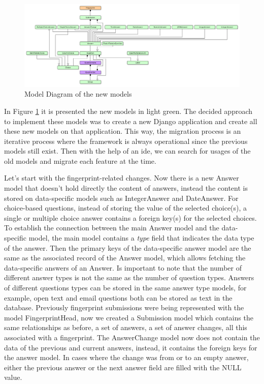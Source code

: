\begin{figure}[h]
    \center
    \includegraphics[width=\textwidth]{new-models}
    \caption{Model Diagram of the new models}
    \label{fig:new-models}
\end{figure}

In Figure \ref{fig:new-models} it is presented the new models in light green.
The decided approach to implement these models was to create a new Django application and create all these new models on that application.
This way, the migration process is an iterative process where the framework is always operational since the previous models still exist.
Then with the help of an \gls{ide}, we can search for usages of the old models and migrate each feature at the time.

Let's start with the fingerprint-related changes.
Now there is a new Answer model that doesn't hold directly the content of answers, instead the content is stored on data-specific models such as IntegerAnswer and DateAnswer.
For choice-based questions, instead of storing the value of the selected choice(s), a single or multiple choice answer contains a foreign key(s) for the selected choices.
To establish the connection between the main Answer model and the data-specific model, the main model contains a \textit{type} field that indicates the data type of the answer.
Then the primary keys of the data-specific answer model are the same as the associated record of the Answer model, which allows fetching the data-specific answers of an Answer.
Is important to note that the number of different answer types is not the same as the number of question types.
Answers of different questions types can be stored in the same answer type models, for example, open text and email questions both can be stored as text in the database.
Previously fingerprint submissions were being represented with the model FingerprintHead, now we created a Submission model which contains the same relationships as before, a set of answers, a set of answer changes, all this associated with a fingerprint.
The AnswerChange model now does not contain the data of the previous and current answers, instead, it contains the foreign keys for the answer model.
In cases where the change was from or to an empty answer, either the previous answer or the next answer field are filled with the NULL value.

